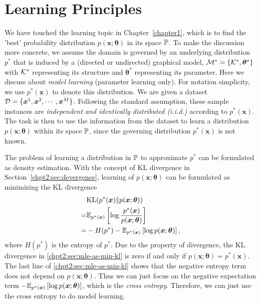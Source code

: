 \section{Learning Principles}
\label{chpt2:sec:learning-principles}
We have touched the learning topic in Chapter~\ref{chapter1}, which is to find the 'best' probability distribution $p(\bm{x}; \bm{\theta})$ in its space $\mathbb{P}$. To make the discussion more concrete, we assume the domain is governed by an underlying distribution $p^{\ast}$ that is induced by a (directed or undirected) graphical model, $\mathcal{M}^{\ast} = \left\{ \mathcal{K}^{\ast}, \bm{\theta}^{\ast} \right\}$ with $\mathcal{K}^{\ast}$ representing its structure and $\bm{\theta}^{\ast}$ representing its parameter. Here we discuss about \textit{model learning} (parameter learning only). For notation simplicity, we use $p^{\ast}(\bm{x})$ to denote this distribution. We are given a dataset $\mathcal{D} = \{\bm{x}^{1}, \bm{x}^{2}, \cdots, \bm{x}^{M}\}$. Following the standard assumption, these sample instances are \textit{independent and identically distributed (i.i.d.)} according to $p^{\ast}(\bm{x})$. The task is then to use the information from the dataset to learn a distribution $p(\bm{x};\bm{\theta})$ within its space $\mathbb{P}$, since the governing distribution $p^{\ast}(\bm{x})$ is not known.

The problem of learning a distribution in $\mathbb{P}$ to approximate $p^{\ast}$ can be formulated as density estimation. With the concept of KL divergence in Section~\ref{chpt2:sec:devergence}, learning of $p(\bm{x};\bm{\theta})$ can be formulated as minimizing the KL divergence
\begin{align}\label{chpt2:sec:mle-as-min-kl}
  &\mathrm{KL}(p^{\ast}(\bm{x})\|p(\bm{x}; \bm{\theta})) \nonumber \\
  =& \mathbb{E}_{p^{\ast}(\bm{x})}\left[ \log{\frac{p^{\ast}(\bm{x})}{p(\bm{x}; \bm{\theta})}} \right] \nonumber \\
  =& - H(p^{\ast}) - \mathbb{E}_{p^{\ast}(\bm{x})}\left[ \log{{p(\bm{x}; \bm{\theta})}} \right],
\end{align}
where $H(p^{\ast})$ is the entropy of $p^{\ast}$.
Due to the property of divergence, the KL divergence in \eqref{chpt2:sec:mle-as-min-kl} is zero if and only if $p(\bm{x};\bm{\theta})=p^{\ast}(\bm{x})$. The last line of \eqref{chpt2:sec:mle-as-min-kl} shows that the negative entropy term does not depend on $p(\bm{x}; \bm{\theta})$. Thus we can just focus on the negative expectation term $-\mathbb{E}_{p^{\ast}(\bm{x})}\left[ \log{{p(\bm{x}; \bm{\theta})}} \right]$, which is the \textit{cross entropy}. Therefore, we can just use the cross entropy to do model learning.

